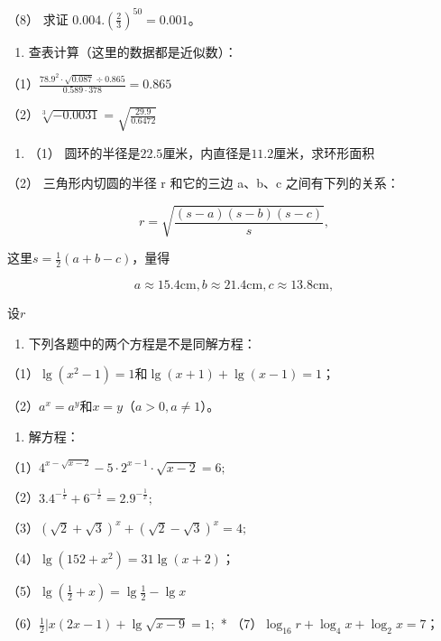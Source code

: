 （8） 求证 0.004.\(\left(\frac{2}{3}\right)^{50}=0.001\)。

\begin{enumerate}[start=28]
\item
  查表计算（这里的数据都是近似数）：
\end{enumerate}

（1）\(\frac{78.9^{2} \cdot \sqrt{0.087} \div 0.865}{0.589 \cdot 378} = 0.865\)

（2）\(\sqrt[3]{-0.0031} = \sqrt{\frac{29.9}{0.6472}}\)

\begin{enumerate}[start=29]
\item
  （1） 圆环的半径是\(22.5\)厘米，内直径是\(11.2\)厘米，求环形面积
\end{enumerate}

（2） 三角形内切圆的半径 r 和它的三边 a、b、c 之间有下列的关系：

\[
r = \sqrt{\frac{(s - a) (s - b) (s - c)}{s}},
\]

这里\(s = \frac{1}{2} (a + b - c)\)，量得

\[
a \approx 15.4 \mathrm{cm}, b \approx 21.4 \mathrm{cm}, c \approx 13.8 \mathrm{cm},
\]

设\(r\)

\begin{enumerate}[start=30]
\item
  下列各题中的两个方程是不是同解方程：
\end{enumerate}

（1）\(\lg (x^2 - 1) = 1\)和\(\lg (x + 1) + \lg (x - 1) = 1\)；

（2）\(a^{x} = a^{y}\)和\(x = y\)（\(a > 0, a \neq 1\)）。

\begin{enumerate}[start=81]
\item
  解方程：
\end{enumerate}

（1）\(4^{x - \sqrt{x - 2}} - 5 \cdot 2^{x - 1} \cdot \sqrt{x - 2} = 6;\)

（2）\(3.4^{-\frac{1}{x}} + 6^{-\frac{1}{x}} = 2.9^{-\frac{1}{x}};\)

（3）\((\sqrt{2} + \sqrt{3})^x + (\sqrt{2} - \sqrt{3})^x = 4;\)

（4）\(\lg (152 + x^2) = 31\lg (x + 2)\)；

（5）\(\lg \left(\frac{1}{2} + x\right) = \lg \frac{1}{2} - \lg x\)

（6）\(\frac{1}{2} |x(2x - 1) + \lg \sqrt{x - 9} = 1;\) *
（7）\(\log_{16} r + \log_{4} x + \log_{2} x = 7\)；

